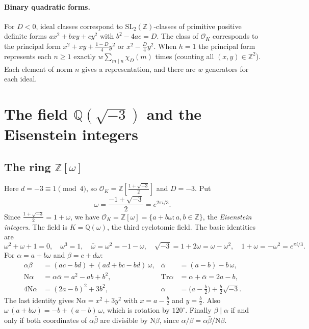 \documentclass[11pt]{article}
\numberwithin{equation}{section}
\newcommand{\N}{\mathrm N}
\newcommand{\Tr}{\mathrm{Tr}}
\newcommand{\OO}{\mathbb Z[\omega]}
\newcommand{\Q}{\mathbb Q}
\newcommand{\Z}{\mathbb Z}
\newcommand{\OK}{\mathcal O_K}
\theoremstyle{definition}
\theoremstyle{remark}
\begin{document}
\paragraph{Binary quadratic forms.} For $D<0$, ideal classes correspond to
$\mathrm{SL}_2(\Z)$-classes of primitive positive definite forms $ax^2+bxy+cy^2$ with
$b^2-4ac=D$. The class of $\OK$ corresponds to the principal form $x^2+xy+\frac{1-D}4y^2$ or
$x^2-\frac D4y^2$. When $h=1$ the principal form represents each $n\ge1$ exactly
$w\sum_{m\mid n}\chi_D(m)$ times (counting all $(x,y)\in\Z^2$). Each element of norm $n$
gives a representation, and there are $w$ generators for each ideal.

\section{The field \texorpdfstring{$\Q(\sqrt{-3})$}{Q(sqrt(-3))} and the Eisenstein integers}\label{sec:eisenstein}

\subsection{The ring \texorpdfstring{$\OO$}{Z[omega]}}
Here $d=-3\equiv1\pmod4$, so $\OK=\Z[\frac{1+\sqrt{-3}}2]$ and $D=-3$. Put
\begin{equation}\label{eq:omega}
 \omega=\frac{-1+\sqrt{-3}}2=e^{2\pi i/3}.
\end{equation}
Since $\frac{1+\sqrt{-3}}2=1+\omega$, we have $\OK=\OO=\{a+b\omega:a,b\in\Z\}$, the
\emph{Eisenstein integers}. The field is $K=\Q(\omega)$, the third cyclotomic field. The
basic identities are
\begin{equation}\label{eq:omegaids}
 \omega^2+\omega+1=0,\quad \omega^3=1,\quad \bar\omega=\omega^2=-1-\omega,\quad
 \sqrt{-3}=1+2\omega=\omega-\omega^2,\quad 1+\omega=-\omega^2=e^{\pi i/3}.
\end{equation}
For $\alpha=a+b\omega$ and $\beta=c+d\omega$:
\begin{equation}\label{eq:arith}
\begin{aligned}
 \alpha\beta&=(ac-bd)+(ad+bc-bd)\,\omega, &
 \bar\alpha&=(a-b)-b\,\omega,\\
 \N\alpha&=\alpha\bar\alpha=a^2-ab+b^2, &
 \Tr\alpha&=\alpha+\bar\alpha=2a-b,\\
 4\N\alpha&=(2a-b)^2+3b^2, &
 \alpha&=\bigl(a-\tfrac b2\bigr)+\tfrac b2\sqrt{-3}.
\end{aligned}
\end{equation}
The last identity gives $\N\alpha=x^2+3y^2$ with $x=a-\frac b2$ and $y=\frac b2$.
Also $\omega\,(a+b\omega)=-b+(a-b)\,\omega$, which is rotation by $120^\circ$. Finally
$\beta\mid\alpha$ if and only if both coordinates of $\alpha\bar\beta$ are divisible by
$\N\beta$, since $\alpha/\beta=\alpha\bar\beta/\N\beta$.
\end{document}
